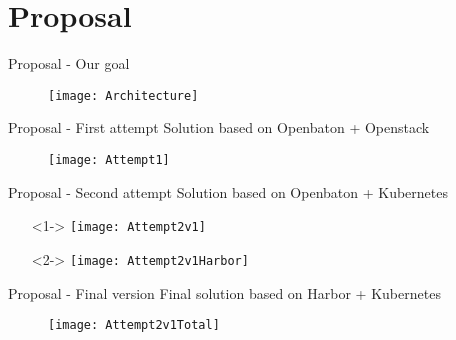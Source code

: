 \section{Proposal}
\begin{frame}{Proposal - Our goal}
  \begin{figure}
    \centering
    \texttt{[image: Architecture]}
  \end{figure}
\end{frame}

\begin{frame}{Proposal - First attempt}
  Solution based on Openbaton + Openstack
  \begin{figure}
    \centering
    \texttt{[image: Attempt1]}
  \end{figure}
\end{frame}

\begin{frame}{Proposal - Second attempt}
  Solution based on Openbaton + Kubernetes
  \begin{itemize}
    \centering
  \item[]<1-> \texttt{[image: Attempt2v1]}
  \item[]<2-> \texttt{[image: Attempt2v1Harbor]}
  \end{itemize}
\end{frame}

\begin{frame}{Proposal - Final version}
  Final solution based on Harbor + Kubernetes
  \begin{figure}
    \centering
    \texttt{[image: Attempt2v1Total]}
  \end{figure}
\end{frame}
